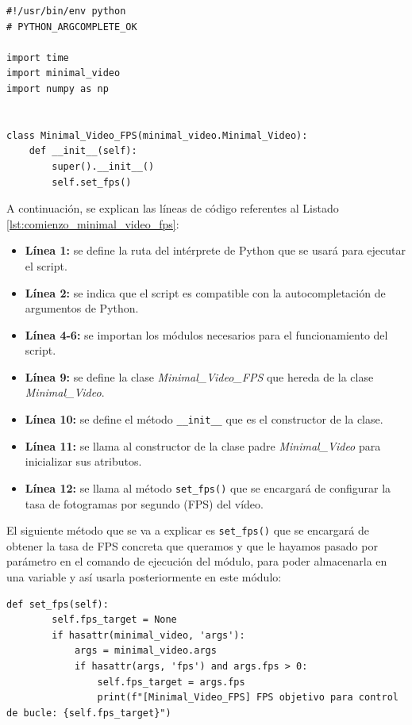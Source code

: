 \begin{lstlisting}[style=pythonstyle, caption={Comienzo del módulo Minimal\_Video\_FPS y su inicialización.}, label={lst:comienzo_minimal_video_fps}]
#!/usr/bin/env python
# PYTHON_ARGCOMPLETE_OK

import time
import minimal_video
import numpy as np


class Minimal_Video_FPS(minimal_video.Minimal_Video):
    def __init__(self):
        super().__init__()
        self.set_fps()

\end{lstlisting}
\vspace{\baselineskip}

A continuación, se explican las líneas de código referentes al Listado \ref{lst:comienzo_minimal_video_fps}:
\begin{itemize}
    \item \textbf{Línea 1:} se define la ruta del intérprete de Python que se usará para ejecutar el script.
    \item \textbf{Línea 2:} se indica que el script es compatible con la autocompletación de argumentos de Python.
    \item \textbf{Línea 4-6:} se importan los módulos necesarios para el funcionamiento del script.
    \item \textbf{Línea 9:} se define la clase \textit{Minimal\_Video\_FPS} que hereda de la clase \textit{Minimal\_Video}.
    \item \textbf{Línea 10:} se define el método \texttt{\_\_init\_\_} que es el constructor de la clase.
    \item \textbf{Línea 11:} se llama al constructor de la clase padre \textit{Minimal\_Video} para inicializar sus atributos.
    \item \textbf{Línea 12:} se llama al método \texttt{set\_fps()} que se encargará de configurar la tasa de fotogramas por segundo (FPS) del vídeo.
\end{itemize}
\vspace{\baselineskip}

El siguiente método que se va a explicar es \texttt{set\_fps()} que se encargará de obtener la tasa de FPS concreta que queramos y que le hayamos pasado por parámetro en el comando de ejecución del módulo, para poder almacenarla en una variable y así usarla posteriormente en este módulo:
\begin{lstlisting}[style=pythonstyle, caption={Método \texttt{set\_fps()} de \textit{Minimal\_Video\_FPS}.}, label={lst:set_fps_minimal_video_fps}]
def set_fps(self):
        self.fps_target = None
        if hasattr(minimal_video, 'args'):
            args = minimal_video.args
            if hasattr(args, 'fps') and args.fps > 0:
                self.fps_target = args.fps
                print(f"[Minimal_Video_FPS] FPS objetivo para control de bucle: {self.fps_target}")
\end{lstlisting}
\vspace{\baselineskip}

